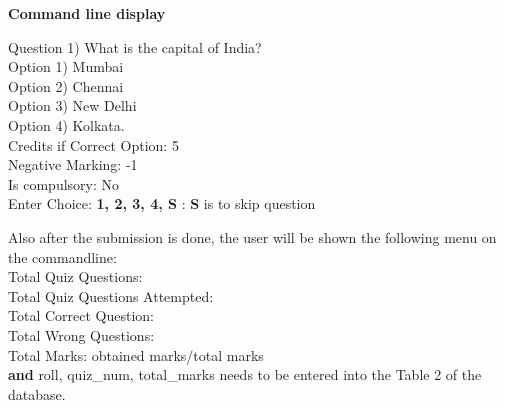 \documentclass[12pt]{article}
\begin{document}
\textbf{Command line display}

Question 1) What is the capital of India? \\
Option 1) Mumbai      \\ 
Option 2) Chennai \\ 
Option 3)  New Delhi \\ 
Option 4)  Kolkata. \\

Credits if Correct Option: 5  \\ 
Negative Marking: -1 \\ 
Is compulsory: No  \\ 

Enter Choice: \textbf{1, 2, 3, 4, S} : \textbf{S} is to skip question

Also after the submission is done, 
the user will be shown the following menu on the commandline:\\
Total Quiz Questions: \\
Total Quiz Questions Attempted:  \\
Total Correct Question:  \\
Total Wrong Questions:  \\
Total Marks: obtained marks/total marks\\

\textbf{and} roll, quiz\_num, total\_marks needs to be entered into the Table 2 of the database.  
\end{document}
